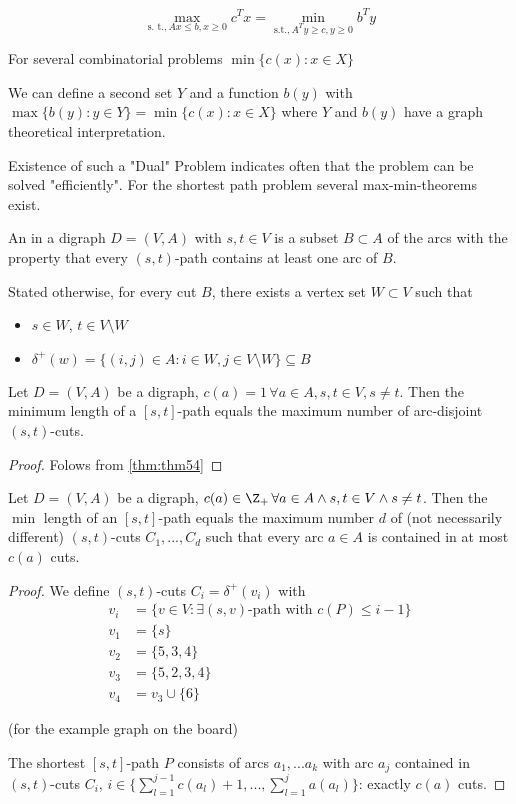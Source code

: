 \[\max_{\text{s. t.}, Ax \leq b, x \geq 0} c^Tx = \min_{\text{s.t.}, A^T y \geq c, y \geq 0} b^T y\]

For several combinatorial problems $\min\{c(x): x \in X\}$

We can define a second set $Y$ and a function $b(y)$ with $\max\{b(y): y \in Y \} = \min \{ c(x): x \in X\}$ where $Y$ and $b(y)$ have a graph theoretical interpretation. 

Existence of such a "Dual" Problem indicates often that the problem can be solved "efficiently". For the shortest path problem several max-min-theorems exist.

\begin{defn}
An  in a digraph $D=(V,A)$ with $s,t \in V$ is a subset $B \subset A$ of the arcs with the property that every $(s,t)$-path contains at least one arc of $B$.

Stated  otherwise, for every cut $B$, there exists a vertex set $W \subset V$ such that
\begin{itemize}
	\item $s \in W$, $t \in V \setminus W$
	\item $\delta^+(w) = \{(i,j) \in A: i \in W, j \in V \setminus W\} \subseteq B$
\end{itemize}
\end{defn}

\begin{thm}
	Let $D=(V,A)$ be a digraph, $c(a)=1 \, \forall a \in A, s,t \in V, s \neq t$. Then the minimum length of a $[s,t]$-path equals the maximum number of arc-disjoint $(s,t)$-cuts. 
\end{thm}

\begin{proof}
	Folows from \ref{thm:thm54} %
\end{proof}

\begin{thm}\label{thm:thm54} %
	Let $D=(V,A)$ be a digraph, $c(a) \in \Z_+ \, \forall a \in A \wedge s,t \in V \wedge s\neq t$. Then the $\min$ length of an $[s,t]$-path equals the maximum number $d$ of (not necessarily different) $(s,t)$-cuts $C_1, ..., C_d$ such that every arc $a \in A$ is contained in at most $c(a)$ cuts.
\end{thm}

\begin{proof}
	We define $(s, t)$-cuts $C_i = \delta^+(v_i)$ with
	\begin{align*}
		v_i & = \{v \in V: \exists \text{$(s,v)$-path with $c(P)\leq i-1$}\} \\
		v_1 & = \{s\} \\
		v_2 & = \{5,3,4\} \\
		v_3 & = \{5,2,3,4\} \\
		v_4 & = v_3 \cup \{ 6 \}
	\end{align*}
	
	(for the example graph on the board)
	
	The shortest $[s,t]$-path $P$ consists of arcs $a_1, ... a_k$ with arc $a_j$ contained in $(s,t)$-cuts $C_i$,  $i \in \{\sum_{l=1}^{j-1} c(a_l) + 1, ..., \sum_{l=1}^j a(a_l)\}$: exactly $c(a)$ cuts.
\end{proof}	
